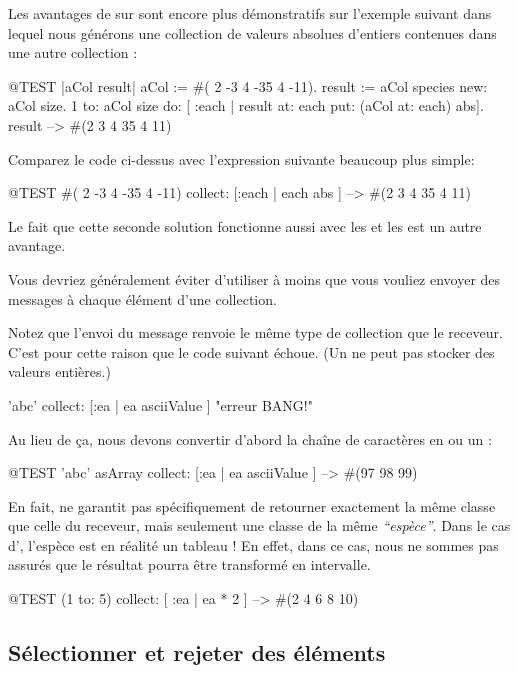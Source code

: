 \documentclass[a4paper,10pt,twoside]{book}
\begin{document}
Les avantages de  sur  sont encore
plus démonstratifs sur l'exemple suivant dans lequel nous générons
une collection de valeurs absolues d'entiers contenues dans une autre
collection :

\begin{code}{@TEST |aCol result|}
aCol :=  #( 2 -3 4 -35 4 -11).
result := aCol species new: aCol size.
1 to: aCol size do: [ :each | result at: each put: (aCol at: each) abs].
result --> #(2 3 4 35 4 11)
\end{code}
\noindent
Comparez le code ci-dessus avec l'expression suivante beaucoup plus simple:
\begin{code}{@TEST}
#( 2 -3 4 -35 4 -11) collect: [:each | each abs ] --> #(2 3 4 35 4 11)
\end{code}
\noindent
Le fait que cette seconde solution fonctionne aussi avec les  et les  est un autre avantage.

Vous devriez généralement éviter d'utiliser  à moins que 
vous vouliez envoyer des messages à chaque élément d'une collection.

Notez que l'envoi du message  renvoie le même type de collection
que le receveur.
C'est pour cette raison que le code suivant échoue.
(Un  ne peut pas stocker des valeurs entières.)
\begin{code}{}
'abc' collect: [:ea | ea asciiValue ]      "erreur BANG!"
\end{code}
\noindent
Au lieu de ça, nous devons convertir d'abord la chaîne de caractères
en  ou un :
\begin{code}{@TEST}
'abc' asArray collect: [:ea | ea asciiValue ] --> #(97 98 99)
\end{code}

En fait,  ne garantit pas spécifiquement de retourner 
exactement la même classe que celle du receveur, mais seulement une classe
de la même \emph{``espèce''}.  Dans le cas d', l'espèce est en réalité un tableau !
En effet, dans ce cas, nous ne sommes pas assurés que le résultat pourra être transformé en intervalle.
\begin{code}{@TEST}
(1 to: 5) collect: [ :ea | ea * 2 ] --> #(2 4 6 8 10)
\end{code}

\subsection{Sélectionner et rejeter des éléments}
\end{document}
